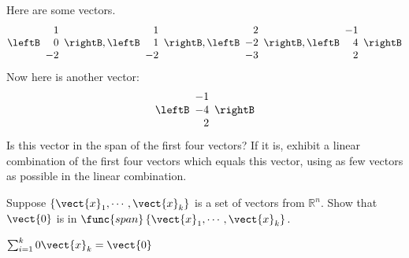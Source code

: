 \begin{enumialphparenastyle}
\begin{ex} Here are some vectors. 
\begin{equation*}
\leftB 
\begin{array}{r}
1 \\ 
0 \\ 
-2
\end{array}
\rightB ,\leftB 
\begin{array}{r}
1 \\ 
1 \\ 
-2
\end{array}
\rightB ,\leftB 
\begin{array}{r}
2 \\ 
-2 \\ 
-3
\end{array}
\rightB ,\leftB 
\begin{array}{r}
-1 \\ 
4 \\ 
2
\end{array}
\rightB
\end{equation*}
Now here is another vector:\ 
\begin{equation*}
\leftB 
\begin{array}{r}
-1 \\ 
-4 \\ 
2
\end{array}
\rightB 
\end{equation*}
Is this vector in the span of the first four vectors? If it is, exhibit a
linear combination of the first four vectors which equals this vector, using
as few vectors as possible in the linear combination.
\end{ex}


\begin{ex} Suppose $\left\{ \vect{x}_{1},\cdots ,\vect{x}_{k}\right\} $ is a
set of vectors from $\mathbb{R}^{n}.$ Show that $\vect{0}$ is in $\func{
span}\left\{ \vect{x}_{1},\cdots ,\vect{x}_{k}\right\} .$
\begin{sol}
$\sum_{i=1}^{k}0\vect{x}_{k}=\vect{0}$
\end{sol}
\end{ex}

\end{enumialphparenastyle}